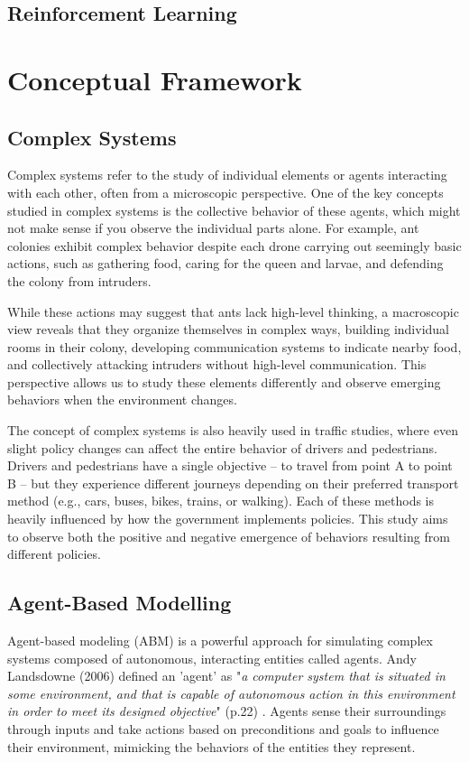 \subsection{Reinforcement Learning}
\section{Conceptual Framework}
\subsection{Complex Systems}

Complex systems refer to the study of individual elements or agents interacting with each other, often from a microscopic perspective. One of the key concepts studied in complex systems is the collective behavior of these agents, which might not make sense if you observe the individual parts alone. For example, ant colonies exhibit complex behavior despite each drone carrying out seemingly basic actions, such as gathering food, caring for the queen and larvae, and defending the colony from intruders.\cite{newman_complex_2011}

While these actions may suggest that ants lack high-level thinking, a macroscopic view reveals that they organize themselves in complex ways, building individual rooms in their colony, developing communication systems to indicate nearby food, and collectively attacking intruders without high-level communication. This perspective allows us to study these elements differently and observe emerging behaviors when the environment changes.

The concept of complex systems is also heavily used in traffic studies, where even slight policy changes can affect the entire behavior of drivers and pedestrians. Drivers and pedestrians have a single objective – to travel from point A to point B – but they experience different journeys depending on their preferred transport method (e.g., cars, buses, bikes, trains, or walking). Each of these methods is heavily influenced by how the government implements policies. This study aims to observe both the positive and negative emergence of behaviors resulting from different policies.

\subsection{Agent-Based Modelling}
Agent-based modeling (ABM) is a powerful approach for simulating complex systems composed of autonomous, interacting entities called agents. Andy Landsdowne (2006) defined an 'agent' as "\textit{a computer system that is situated in some environment, and that is capable of autonomous action in this environment in order to meet its designed objective}" (p.22) \cite{lansdowne_multi-agent_2006}. Agents sense their surroundings through inputs and take actions based on preconditions and goals to influence their environment, mimicking the behaviors of the entities they represent.

